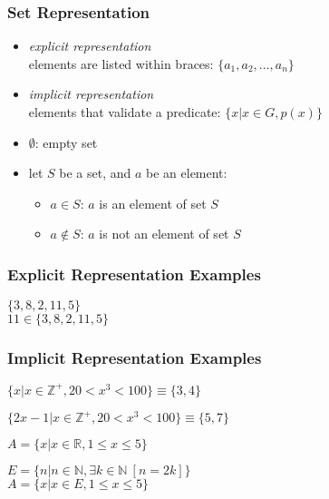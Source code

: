 \documentclass[dvipsnames]{beamer}
\begin{document}
\begin{frame}
  \frametitle{Set Representation}

  \begin{itemize}
    \item \emph{explicit representation}\\
      elements are listed within braces: $\{a_1,a_2,\dots,a_n\}$

    \pause
    \medskip
    \item \emph{implicit representation}\\
      elements that validate a predicate: $\{x | x \in G, p(x)\}$

    \pause
    \medskip
    \item $\emptyset$: empty set

    \pause
    \medskip
    \item let $S$ be a set, and $a$ be an element:
    \begin{itemize}
      \item $a \in S$: $a$ is an element of set $S$
      \item $a \notin S$: $a$ is not an element of set $S$
    \end{itemize}
  \end{itemize}
\end{frame}

\begin{frame}
  \frametitle{Explicit Representation Examples}

  \begin{example}
    $\{3,8,2,11,5\}$\\
    $11 \in \{3,8,2,11,5\}$
  \end{example}
\end{frame}

\begin{frame}
  \frametitle{Implicit Representation Examples}

  \begin{example}
    $\{ x | x \in \mathbb{Z}^+, 20 < x^3 < 100 \} \equiv \{3,4\}$

    $\{ 2x-1 | x \in \mathbb{Z}^+, 20 < x^3 < 100 \} \equiv \{5,7\}$
  \end{example}

  \pause
  \begin{example}
    $A = \{ x | x \in \mathbb{R}, 1 \leq x \leq 5 \}$
  \end{example}

  \pause
  \begin{example}
    $E = \{ n | n \in \mathbb{N}, \exists k \in \mathbb{N}~[n=2k] \}$\\
    $A = \{ x | x \in E, 1 \leq x \leq 5 \}$
  \end{example}
\end{frame}
\end{document}
